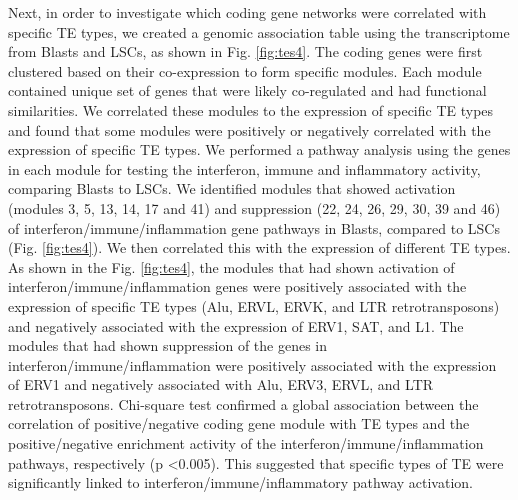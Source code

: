 Next, in order to investigate which coding gene networks were correlated with specific TE types, we created a genomic association table using the transcriptome from Blasts and LSCs, as shown in Fig. \ref{fig:tes4}. The coding genes were first clustered based on their co-expression to form specific modules. Each module contained unique set of genes that were likely co-regulated and had functional similarities. %
We correlated these modules to the expression of specific TE types and found that some modules were positively or negatively correlated with the expression of specific TE types. We performed a pathway analysis using the genes in each module for testing the interferon, immune and inflammatory activity, comparing Blasts to LSCs. We identified modules that showed activation (modules 3, 5, 13, 14, 17 and 41) and suppression (22, 24, 26, 29, 30, 39 and 46) of interferon/immune/inflammation gene pathways in Blasts, compared to LSCs (Fig. \ref{fig:tes4}). We then correlated this with the expression of different TE types. As shown in the Fig. \ref{fig:tes4}, the modules that had shown activation of interferon/immune/inflammation genes were positively associated with the expression of specific TE types (Alu, ERVL, ERVK, and LTR retrotransposons) and negatively associated with the expression of ERV1, SAT, and L1. The modules that had shown suppression of the genes in interferon/immune/inflammation were positively associated with the expression of ERV1 and negatively associated with Alu, ERV3, ERVL, and LTR retrotransposons. Chi-square test confirmed a global association between the correlation of positive/negative coding gene module with TE types and the positive/negative enrichment activity of the interferon/immune/inflammation pathways, respectively (p \textless 0.005). This suggested that specific types of TE were significantly linked to interferon/immune/inflammatory pathway activation.

